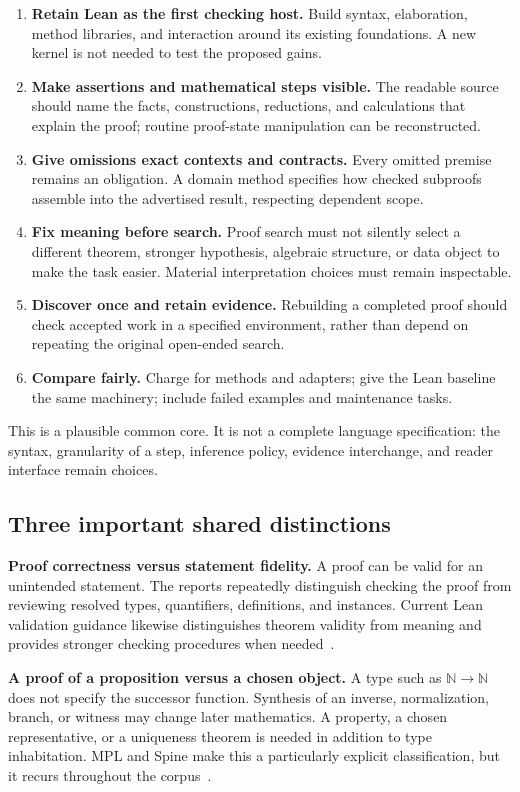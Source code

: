 \documentclass[11pt,letterpaper]{article}
\newcommand{\N}{\mathbb N}
\begin{document}
\begin{enumerate}
\item \textbf{Retain Lean as the first checking host.} Build syntax, elaboration,
  method libraries, and interaction around its existing foundations. A new kernel
  is not needed to test the proposed gains.
\item \textbf{Make assertions and mathematical steps visible.} The readable source
  should name the facts, constructions, reductions, and calculations that explain
  the proof; routine proof-state manipulation can be reconstructed.
\item \textbf{Give omissions exact contexts and contracts.} Every omitted premise
  remains an obligation. A domain method specifies how checked subproofs assemble
  into the advertised result, respecting dependent scope.
\item \textbf{Fix meaning before search.} Proof search must not silently select a
  different theorem, stronger hypothesis, algebraic structure, or data object to
  make the task easier. Material interpretation choices must remain inspectable.
\item \textbf{Discover once and retain evidence.} Rebuilding a completed proof should
  check accepted work in a specified environment, rather than depend on repeating
  the original open-ended search.
\item \textbf{Compare fairly.} Charge for methods and adapters; give the Lean
  baseline the same machinery; include failed examples and maintenance tasks.
\end{enumerate}

This is a plausible common core. It is not a complete language specification:
the syntax, granularity of a step, inference policy, evidence interchange, and
reader interface remain choices.

\subsection{Three important shared distinctions}
\textbf{Proof correctness versus statement fidelity.} A proof can be valid for an
unintended statement. The reports repeatedly distinguish checking the proof from
reviewing resolved types, quantifiers, definitions, and instances. Current Lean
validation guidance likewise distinguishes theorem validity from meaning and
provides stronger checking procedures when needed~\cite{lean-validation}.

\textbf{A proof of a proposition versus a chosen object.} A type such as
\(\N\to\N\) does not specify the successor function. Synthesis of an inverse,
normalization, branch, or witness may change later mathematics. A property, a
chosen representative, or a uniqueness theorem is needed in addition to type
inhabitation. MPL and Spine make this a particularly explicit classification,
but it recurs throughout the corpus~\cite[\S12.4]{mpl}\cite[\S9.1]{spine}.
\end{document}
